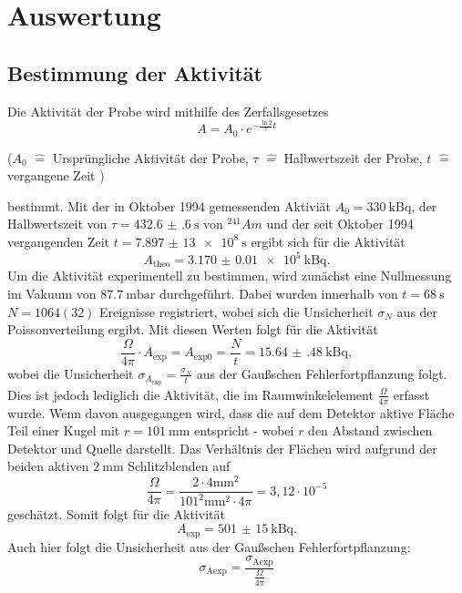 \section{Auswertung}
\subsection{Bestimmung der Aktivität}
Die Aktivität der Probe wird mithilfe des Zerfallsgesetzes 
\begin{equation}
    A = A_0 \cdot e^{-\frac{\ln{2}}{\tau}t}
\end{equation}

\begin{center}
    \tiny{($A_0 $ $\hat{=}$ Ursprüngliche Aktivität der Probe, $\tau$ $\hat{=}$ Halbwertszeit der Probe, $t$ $\hat{=}$ vergangene Zeit )}
\end{center}
bestimmt. 
Mit der in Oktober 1994 gemessenden Aktiviät $A_0 = \SI{330}{\kilo\becquerel}$, der Halbwertszeit von $\tau = \SI{432.6(6)}{\second}$ von $^{241}{Am}$ und der seit Oktober 1994 vergangenden Zeit $t = \SI{7,897(13)e8}{\second}$ ergibt sich für die Aktivität
\begin{equation}
    A_\text{theo} = \SI{3.170(10)e5}{\kilo\becquerel} .
\end{equation}
Um die Aktivität experimentell zu bestimmen, wird zunächst eine Nullmessung im Vakuum von $\SI{87,7}{\milli \bar}$ durchgeführt. Dabei wurden innerhalb von $t=\SI{68}{\second}$ $N=1064(32)$ Ereignisse registriert, wobei sich die Unsicherheit $\sigma_N$ aus der Poissonverteilung ergibt. 
Mit diesen Werten folgt für die Aktivität
\begin{equation}
    \frac{\Omega}{4 \pi } \cdot  A_\text{exp} = A_\text{exp0} = \frac{N}{t} = \SI{15.64(48)}{\kilo\becquerel} ,
\end{equation}
wobei die Unsicherheit $\sigma_{ A_\text{exp}} = \frac{\sigma_N}{t}$ aus der Gaußschen Fehlerfortpflanzung folgt. 
Dies ist jedoch lediglich die Aktivität, die im Raumwinkelelement $\frac{\Omega}{4 \pi}$ erfasst wurde. Wenn davon ausgegangen wird, dass die auf dem Detektor aktive Fläche Teil einer Kugel mit $r = \SI{101}{\milli \meter}$ entspricht - wobei $r$ den Abstand zwischen Detektor und Quelle darstellt. 
Das Verhältnis der Flächen wird aufgrund der beiden aktiven  $\SI{2}{\milli \meter}$ Schlitzblenden auf 
\begin{equation}
    \frac{\Omega}{4 \pi } = \frac{2 \cdot 4 \si{\milli \meter}^2}{101^2 \si{\milli \meter}^2 \cdot 4\pi } = 3,12 \cdot 10^{-5}
\end{equation}
geschätzt.
Somit folgt für die Aktivität
\begin{equation}
    A_\text{exp} = \SI{501(15)}{\kilo\becquerel} .
\end{equation}
Auch hier folgt die Unsicherheit aus der Gaußschen Fehlerfortpflanzung: 
\begin{equation}
    \sigma_\text{Aexp} =  \frac {\sigma_\text{Aexp}}{\frac{\Omega}{4 \pi }} 
\end{equation} 

